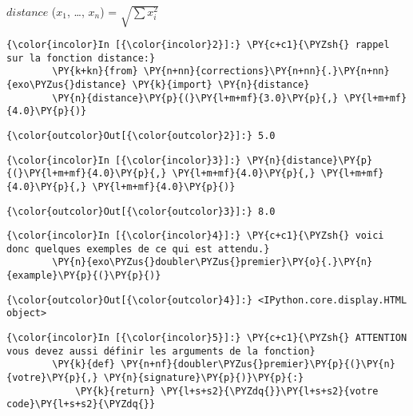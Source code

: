 \(distance\) (\(x_1\), \ldots{}, \(x_n\)) = \(\sqrt{\sum x_i^2}\)

    \begin{Verbatim}[commandchars=\\\{\}]
{\color{incolor}In [{\color{incolor}2}]:} \PY{c+c1}{\PYZsh{} rappel sur la fonction distance:}
        \PY{k+kn}{from} \PY{n+nn}{corrections}\PY{n+nn}{.}\PY{n+nn}{exo\PYZus{}distance} \PY{k}{import} \PY{n}{distance}
        \PY{n}{distance}\PY{p}{(}\PY{l+m+mf}{3.0}\PY{p}{,} \PY{l+m+mf}{4.0}\PY{p}{)}
\end{Verbatim}


\begin{Verbatim}[commandchars=\\\{\}]
{\color{outcolor}Out[{\color{outcolor}2}]:} 5.0
\end{Verbatim}
            
    \begin{Verbatim}[commandchars=\\\{\}]
{\color{incolor}In [{\color{incolor}3}]:} \PY{n}{distance}\PY{p}{(}\PY{l+m+mf}{4.0}\PY{p}{,} \PY{l+m+mf}{4.0}\PY{p}{,} \PY{l+m+mf}{4.0}\PY{p}{,} \PY{l+m+mf}{4.0}\PY{p}{)}
\end{Verbatim}


\begin{Verbatim}[commandchars=\\\{\}]
{\color{outcolor}Out[{\color{outcolor}3}]:} 8.0
\end{Verbatim}
            
    \begin{Verbatim}[commandchars=\\\{\}]
{\color{incolor}In [{\color{incolor}4}]:} \PY{c+c1}{\PYZsh{} voici donc quelques exemples de ce qui est attendu.}
        \PY{n}{exo\PYZus{}doubler\PYZus{}premier}\PY{o}{.}\PY{n}{example}\PY{p}{(}\PY{p}{)}
\end{Verbatim}


\begin{Verbatim}[commandchars=\\\{\}]
{\color{outcolor}Out[{\color{outcolor}4}]:} <IPython.core.display.HTML object>
\end{Verbatim}
            
    \begin{Verbatim}[commandchars=\\\{\}]
{\color{incolor}In [{\color{incolor}5}]:} \PY{c+c1}{\PYZsh{} ATTENTION vous devez aussi définir les arguments de la fonction}
        \PY{k}{def} \PY{n+nf}{doubler\PYZus{}premier}\PY{p}{(}\PY{n}{votre}\PY{p}{,} \PY{n}{signature}\PY{p}{)}\PY{p}{:}
            \PY{k}{return} \PY{l+s+s2}{\PYZdq{}}\PY{l+s+s2}{votre code}\PY{l+s+s2}{\PYZdq{}}
\end{Verbatim}


